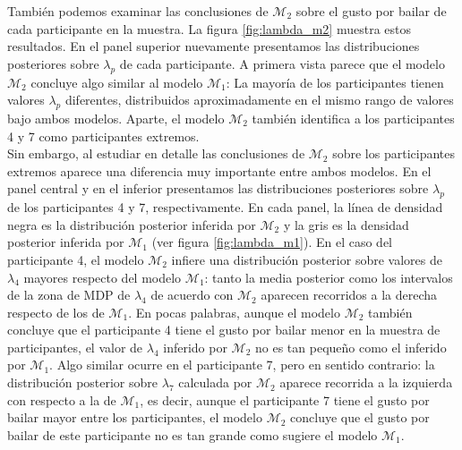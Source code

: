 \documentclass{article}
\begin{document}
\indent También podemos examinar las conclusiones de $\mathcal M_2$ sobre el gusto por bailar de cada participante en la muestra. La figura \ref{fig:lambda_m2} muestra estos resultados. En el panel superior nuevamente presentamos las distribuciones posteriores sobre $\lambda_p$ de cada participante. A primera vista parece que el modelo $\mathcal M_2$ concluye algo similar al modelo $\mathcal M_1$: La mayoría de los participantes tienen valores $\lambda_p$ diferentes, distribuidos aproximadamente en el mismo rango de valores bajo ambos modelos. Aparte, el modelo $\mathcal M_2$ también identifica a los participantes 4 y 7 como participantes extremos.\\
\indent Sin embargo, al estudiar en detalle las conclusiones de $\mathcal M_2$ sobre los participantes extremos aparece una diferencia muy importante entre ambos modelos. En el panel central y en el inferior presentamos las distribuciones posteriores sobre $\lambda_p$ de los participantes 4 y 7, respectivamente. En cada panel, la línea de densidad negra es la distribución posterior inferida por $\mathcal M_2$ y la gris es la densidad posterior inferida por $\mathcal M_1$ (ver figura \ref{fig:lambda_m1}). En el caso del participante 4, el modelo $\mathcal M_2$ infiere una distribución posterior sobre valores de $\lambda_4$ mayores respecto del modelo $\mathcal M_1$: tanto la media posterior como los intervalos de la zona de MDP de $\lambda_4$ de acuerdo con $\mathcal M_2$ aparecen recorridos a la derecha respecto de los de $\mathcal M_1$. En pocas palabras, aunque el modelo $\mathcal M_2$ también concluye que  el participante 4 tiene el gusto por bailar menor en la muestra de participantes, el valor de $\lambda_4$ inferido por $\mathcal M_2$ no es tan pequeño como el inferido por $\mathcal M_1$. Algo similar ocurre en el participante 7, pero en sentido contrario: la distribución posterior sobre $\lambda_7$ calculada por $\mathcal M_2$ aparece recorrida a la izquierda con respecto a la de $\mathcal M_1$, es decir, aunque el participante 7 tiene el gusto por bailar mayor entre los participantes, el modelo $\mathcal M_2$ concluye que el gusto por bailar de este participante no es tan grande como sugiere el modelo $\mathcal M_1$.\\
\end{document}
